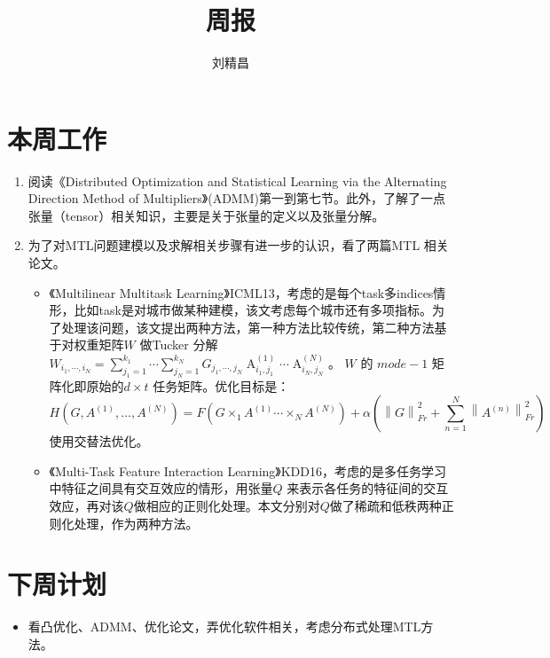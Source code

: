 \documentclass{ctexart}
\begin{document}
\title{周报}
\author{刘精昌}
\maketitle
\fangsong

\section*{本周工作}
\begin{enumerate}
  \item 阅读《Distributed Optimization and Statistical Learning via the Alternating Direction Method of Multipliers》(ADMM)第一到第七节。此外，了解了一点张量（tensor）相关知识，主要是关于张量的定义以及张量分解。
  \item 为了对MTL问题建模以及求解相关步骤有进一步的认识，看了两篇MTL 相关论文。
  \begin{itemize}
    \item 《Multilinear Multitask Learning》ICML13，考虑的是每个task多indices情形，比如task是对城市做某种建模，该文考虑每个城市还有多项指标。为了处理该问题，该文提出两种方法，第一种方法比较传统，第二种方法基于对权重矩阵$W$ 做Tucker 分解 $W_{i_1,\cdots,i_N} = \sum\limits_{{j_1} = 1}^{{k_1}} { \cdots \sum\limits_{{j_N} = 1}^{{k_N}} {{G_{{j_1}, \cdots ,{j_N}}}\mathop A\nolimits_{{i_1},{j_1}}^{\left( 1 \right)}  \cdots } } \mathop A\nolimits_{{i_N},{j_N}}^{\left( N \right)} $。 $W$ 的 $mode-1$ 矩阵化即原始的$d \times t $ 任务矩阵。优化目标是：\[H\left( {G,{A^{\left( 1 \right)}}, \ldots ,{A^{\left( N \right)}}} \right) = F\left( {G{ \times _1}{A^{\left( 1 \right)}} \cdots { \times _N}{A^{\left( N \right)}}} \right) + \alpha \left( {\left\| G \right\|_{Fr}^2 + \sum\limits_{n = 1}^N {\left\| {{A^{\left( n \right)}}} \right\|_{Fr}^2} } \right)\]
        使用交替法优化。
    \item 《Multi-Task Feature Interaction Learning》KDD16，考虑的是多任务学习中特征之间具有交互效应的情形，用张量$Q$ 来表示各任务的特征间的交互效应，再对该$Q$做相应的正则化处理。本文分别对$Q$做了稀疏和低秩两种正则化处理，作为两种方法。
  \end{itemize}
\end{enumerate}

\section*{下周计划}
\begin{itemize}
  \item 看凸优化、ADMM、优化论文，弄优化软件相关，考虑分布式处理MTL方法。
\end{itemize}
\end{document}
